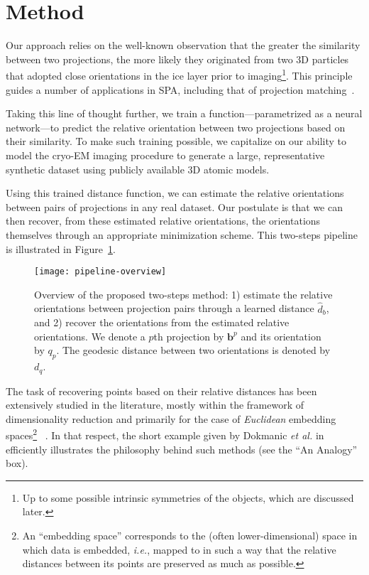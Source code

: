 \section{Method}

Our approach relies on the well-known observation that the greater the similarity between two projections, the more likely they originated from two 3D particles that adopted close orientations in the ice layer prior to imaging\footnote{Up to some possible intrinsic symmetries of the objects, which are discussed later.}. This principle guides a number of applications in SPA, including that of projection matching~\cite{penczek1994ribosome}.

Taking this line of thought further, we train a function---parametrized as a neural network---to predict the relative orientation between two projections based on their similarity. To make such training possible, we capitalize on our ability to model the cryo-EM imaging procedure to generate a large, representative synthetic dataset using publicly available 3D atomic models.

Using this trained distance function, we can estimate the relative orientations between pairs of projections in any real dataset. Our postulate is that we can then recover, from these estimated relative orientations, the orientations themselves through an appropriate minimization scheme. This two-steps pipeline is illustrated in Figure~\ref{fig:overview-pipeline}.

\begin{figure}
    \centering
    \texttt{[image: pipeline-overview]}
    \caption{Overview of the proposed two-steps method: 1) estimate the relative orientations between projection pairs through a learned distance $\widehat{d}_b$, and 2) recover the orientations from the estimated relative orientations. We denote a $p$th projection by $\mathbf{b}^p$ and its orientation by $q_p$. The geodesic distance between two orientations is denoted by $d_q$.}
    \label{fig:overview-pipeline}
\end{figure}

The task of recovering points based on their relative distances has been extensively studied in the literature, mostly within the framework of dimensionality reduction and primarily for the case of \textit{Euclidean} embedding spaces\footnote{An ``embedding space'' corresponds to the (often lower-dimensional) space in which data is embedded, \textit{i.e.}, mapped to in such a way that the relative distances between its points are preserved as much as possible.}~\cite{belkin2003laplacian,kruskal1978multidimensional, maaten2008visualizing, mcinnes2018umap,dokmanic2015euclidean} . In that respect, the short example given by Dokmanic \textit{et al.} in~\cite{dokmanic2015euclidean} efficiently illustrates the philosophy behind such methods (see the ``An Analogy'' box).

